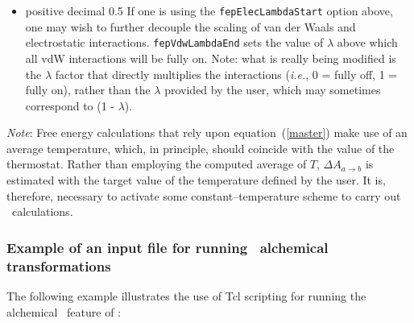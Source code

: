 \begin{itemize}
\item
{}
{positive decimal}
{0.5}
{If one is using the {\tt fepElecLambdaStart} option above, one may wish to further decouple the scaling of van der Waals and electrostatic interactions. {\tt fepVdwLambdaEnd} sets the value of $\lambda$ above which all vdW interactions will be fully on. Note: what is really being modified is the $\lambda$ factor that directly multiplies the interactions (\emph{i.e.}, 0 = fully off, 1 = fully on), rather than the $\lambda$ provided by the user, which may sometimes correspond to (1 - $\lambda$).}





\end{itemize}


\noindent
{\it Note}: Free energy calculations that rely upon equation~({\ref{master}})
make use of an average temperature, which, in principle, should coincide with
the value of the thermostat. Rather than employing the computed average of $T$,
$\Delta A_{a \rightarrow b}$ is estimated with the target value of the
temperature defined by the user. It is, therefore, necessary to activate
some constant--temperature scheme to carry out \FEP\ calculations. 



\subsubsection{Example of an input file for running \FEP\ alchemical transformations}


The following example illustrates the use of {\sc Tcl} scripting for running
the alchemical \FEP\ feature of \NAMD: 

